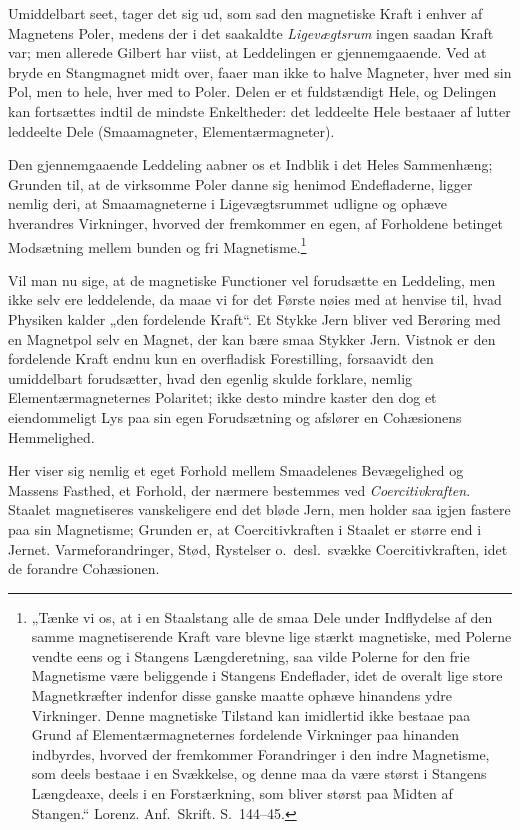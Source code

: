 \documentclass[12pt,a4paper]{book}
\begin{document}
Umiddelbart seet, tager det sig ud, som sad den magnetiske Kraft i
enhver af Magnetens Poler, medens der i det saakaldte
\emph{Ligevægtsrum} ingen saadan Kraft var; men allerede Gilbert har
viist, at Leddelingen er gjennemgaaende. Ved at bryde en Stangmagnet
midt over, faaer man ikke to halve Magneter, hver med sin Pol, men to
hele, hver med to Poler. Delen er et fuldstændigt Hele, og Delingen
kan fortsættes indtil de mindste Enkeltheder: det leddeelte Hele
bestaaer af lutter leddeelte Dele (Smaamagneter, Elementærmagneter).

Den gjennemgaaende Leddeling aabner os et Indblik i det Heles
Sammenhæng; Grunden til, at de virksomme Poler danne sig henimod
Endefladerne, ligger nemlig deri, at Smaamagneterne i Ligevægtsrummet
udligne og ophæve hverandres Virkninger, hvorved der fremkommer en
egen, af Forholdene betinget Modsætning mellem bunden og fri
Magnetisme.\footnote{%
„Tænke vi os, at i en Staalstang alle de smaa Dele under Indflydelse
af den samme magnetiserende Kraft vare blevne lige stærkt magnetiske,
med Polerne vendte eens og i Stangens Længderetning, saa vilde Polerne
for den frie Magnetisme være beliggende i Stangens Endeflader, idet de
overalt lige store Magnetkræfter indenfor disse ganske maatte ophæve
hinandens ydre Virkninger. Denne magnetiske Tilstand kan imidlertid
ikke bestaae paa Grund af Elementærmagneternes fordelende Virkninger
paa hinanden indbyrdes, hvorved der fremkommer Forandringer i den
indre Magnetisme, som deels bestaae i en Svækkelse, og denne maa da
være størst i Stangens Længdeaxe, deels i en Forstærkning, som bliver
størst paa Midten af Stangen.“ Lorenz. Anf.\ Skrift. S.\ 144--45.}

Vil man nu sige, at de magnetiske Functioner vel forudsætte en
Leddeling, men ikke selv ere leddelende, da maae vi for det Første
nøies med at henvise til, hvad Physiken kalder „den fordelende Kraft“.
Et Stykke Jern bliver ved Berøring med en Magnetpol selv en Magnet,
der kan bære smaa Stykker Jern. Vistnok er den fordelende Kraft endnu
kun en overfladisk Forestilling, forsaavidt den umiddelbart
forudsætter, hvad den egenlig skulde forklare, nemlig
Elementærmagneternes Polaritet; ikke desto mindre kaster den dog et
eiendommeligt Lys paa sin egen Forudsætning og afslører en Cohæsionens
Hemmelighed.

Her viser sig nemlig et eget Forhold mellem Smaadelenes Bevægelighed
og Massens Fasthed, et Forhold, der nærmere bestemmes ved
\emph{Coercitivkraften}. Staalet magnetiseres vanskeligere end det
bløde Jern, men holder saa igjen fastere paa sin Magnetisme; Grunden
er, at Coercitivkraften i Staalet er større end i Jernet.
Varmeforandringer, Stød, Rystelser o.\ desl.\ svække
Coercitivkraften, idet de forandre Cohæsionen.
\end{document}
